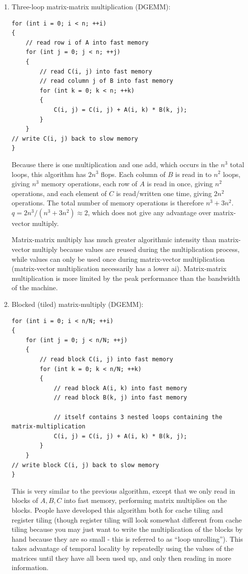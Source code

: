 \documentclass[10pt]{article}
\begin{document}
\begin{flushleft}
\begin{enumerate}
\item Three-loop matrix-matrix multiplication (DGEMM): 

\begin{lstlisting}[basicstyle=\ttfamily\small]
for (int i = 0; i < n; ++i)
{
	// read row i of A into fast memory
	for (int j = 0; j < n; ++j)
	{	
		// read C(i, j) into fast memory
		// read column j of B into fast memory
		for (int k = 0; k < n; ++k)
		{
			C(i, j) = C(i, j) + A(i, k) * B(k, j);
		}
	}
// write C(i, j) back to slow memory
}
\end{lstlisting}

Because there is one multiplication and one add, which occurs in the \(n^3\) total loops, this algorithm has \(2n^3\) flops. Each column of \(B\) is read in to \(n^2\) loops, giving \(n^3\) memory operations, each row of \(A\) is read in once, giving \(n^2\) operations, and each element of \(C\) is read/written one time, giving \(2n^2\) operations. The total number of memory operations is therefore \(n^3+3n^2\). \(q=2n^3/(n^3+3n^2)\approx 2\), which does not give any advantage over matrix-vector multiply.

Matrix-matrix multiply has much greater algorithmic intensity than matrix-vector multiply because values are reused during the multiplication process, while values can only be used once during matrix-vector multiplication (matrix-vector multiplication necessarily has a lower \gls{ai}). Matrix-matrix multiplication is more limited by the peak performance than the bandwidth of the machine.

\item Blocked (tiled) matrix-multiply (DGEMM):

\begin{lstlisting}[basicstyle=\ttfamily\small]
for (int i = 0; i < n/N; ++i)
{
	for (int j = 0; j < n/N; ++j)
	{	
		// read block C(i, j) into fast memory
		for (int k = 0; k < n/N; ++k)
		{
			// read block A(i, k) into fast memory
			// read block B(k, j) into fast memory
			
			// itself contains 3 nested loops containing the matrix-multiplication
			C(i, j) = C(i, j) + A(i, k) * B(k, j); 
		}
	}
// write block C(i, j) back to slow memory
}
\end{lstlisting}

This is very similar to the previous algorithm, except that we only read in blocks of \(A, B, C\) into fast memory, performing matrix multiplies on the blocks. People have developed this algorithm both for cache tiling and register tiling (though register tiling will look somewhat different from cache tiling because you may just want to write the multiplication of the blocks by hand because they are so small - this is referred to as ``loop unrolling''). This takes advantage of temporal locality by repeatedly using the values of the matrices until they have all been used up, and only then reading in more information. 


\end{enumerate}
\end{flushleft}
\end{document}
